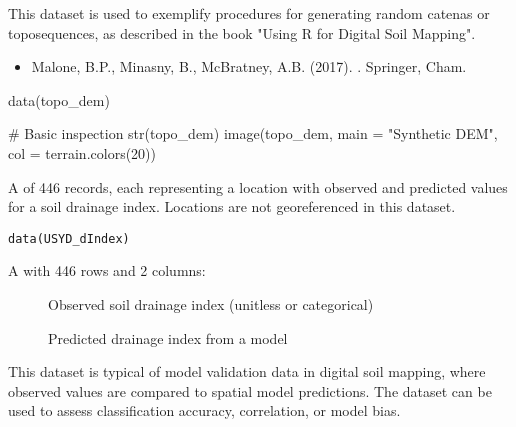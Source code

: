 \documentclass[a4paper]{book}
\begin{document}
%
\begin{Details}
This dataset is used to exemplify procedures for generating random catenas or toposequences, as described in the book "Using R for Digital Soil Mapping".
\end{Details}
%
\begin{References}
\begin{itemize}

\item{} Malone, B.P., Minasny, B., McBratney, A.B. (2017). . Springer, Cham.

\end{itemize}

\end{References}
%
\begin{Examples}
\begin{ExampleCode}
data(topo_dem)

# Basic inspection
str(topo_dem)
image(topo_dem, main = "Synthetic DEM", col = terrain.colors(20))
\end{ExampleCode}
\end{Examples}
%
\begin{Description}
A  of 446 records, each representing a location with observed and predicted values for a soil drainage index. Locations are not georeferenced in this dataset.
\end{Description}
%
\begin{Usage}
\begin{verbatim}
data(USYD_dIndex)
\end{verbatim}
\end{Usage}
%
\begin{Format}
A  with 446 rows and 2 columns:
\begin{description}

\item[] Observed soil drainage index (unitless or categorical)
\item[] Predicted drainage index from a model

\end{description}

\end{Format}
%
\begin{Details}
This dataset is typical of model validation data in digital soil mapping, where observed values are compared to spatial model predictions. The dataset can be used to assess classification accuracy, correlation, or model bias.
\end{Details}
\end{document}
